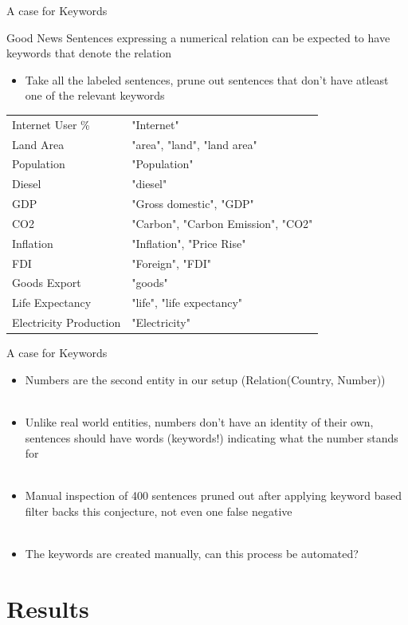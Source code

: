 \documentclass{beamer}
\begin{document}
\begin{frame}{A case for Keywords}
 \begin{exampleblock}{Good News}
  Sentences expressing a numerical relation can be expected to have keywords that denote the relation
 \end{exampleblock}

 \begin{itemize}
  \item Take all the labeled sentences, prune out sentences that don't have atleast one of the relevant keywords
 \end{itemize}
 
 \begin{tabular}{|l|l|}
  \hline
  Internet User \% & "Internet" \\
Land Area & "area", "land", "land area" \\
Population &"Population" \\
Diesel & "diesel" \\
GDP &"Gross domestic", "GDP" \\
CO2 &"Carbon", "Carbon Emission", "CO2" \\
Inflation & "Inflation", "Price Rise" \\
FDI & "Foreign", "FDI" \\
Goods Export & "goods" \\
Life Expectancy & "life", "life expectancy" \\
Electricity Production & "Electricity" \\
 \hline
 \end{tabular}
\end{frame}
\begin{frame}{A case for Keywords}
\begin{itemize} 
  \item Numbers are the second entity in our setup (Relation(Country, Number)) \\~\\
  \item Unlike real world entities, numbers don't have an identity of their own, sentences should have words (keywords!) indicating what the number stands for \\~\\
  \item Manual inspection of 400 sentences pruned out after applying keyword based filter backs this conjecture, not even one false negative \\~\\
  \item The keywords are created manually, can this process be automated?
\end{itemize}
\end{frame}
\section{Results}
\end{document}
